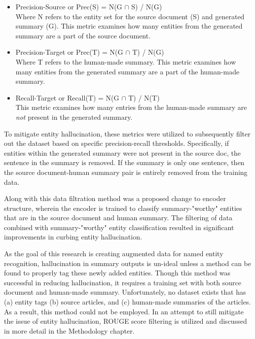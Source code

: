 \documentclass[12pt]{report}
\begin{document}
            \begin{itemize}
                \item Precision-Source or Prec(S) = N(G $\cap$ S) / N(G)\\ Where N refers to the entity set for the source document (S) and generated summary (G). This metric examines how many entities from the generated summary are a part of the source document.
                \item Precision-Target or Prec(T) = N(G $\cap$ T) / N(G)\\ Where T refers to the human-made summary. This metric examines how many entities from the generated summary are a part of the human-made summary.
                \item Recall-Target or Recall(T) = N(G $\cap$ T) / N(T)\\ This metric examines how many entries from the human-made summary are \textit{not} present in the generated summary.
            \end{itemize}
            
            To mitigate entity hallucination, these metrics were utilized to subsequently filter out the dataset based on specific precision-recall thresholds. Specifically, if entities within the generated summary were not present in the source doc, the sentence in the summary is removed. If the summary is only one sentence, then the source document-human summary pair is entirely removed from the training data.
            
            Along with this data filtration method was a proposed change to encoder structure, wherein the encoder is trained to classify summary-"worthy" entities that are in the source document and human summary. The filtering of data combined with summary-"worthy" entity classification resulted in significant improvements in curbing entity hallucination.
            
            As the goal of this research is creating augmented data for named entity recognition, hallucination in summary outputs is un-ideal unless a method can be found to properly tag these newly added entities. Though this method was successful in reducing hallucination, it requires a training set with both source document and human-made summary. Unfortunately, no dataset exists that has (a) entity tags (b) source articles, and (c) human-made summaries of the articles. As a result, this method could not be employed. In an attempt to still mitigate the issue of entity hallucination, ROUGE score filtering is utilized and discussed in more detail in the Methodology chapter.
\end{document}
